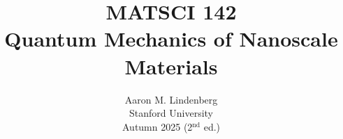 \documentclass[12pt, english]{book}
\title{{\LARGE \textbf{MATSCI 142}} \\ Quantum Mechanics of Nanoscale Materials \vspace{10ex}}
\author{\vspace{1ex} Aaron M. Lindenberg \\ \vspace{1ex} Stanford University \\  \vspace{1ex} Autumn 2025 (2$^{\text{nd}}$ ed.) 
}
\date{}
\begin{document}
	
\frontmatter %
\let\cleardoublepage\clearpage %
\maketitle
\tableofcontents


%

\mainmatter 		%











\appendix








\end{document}
